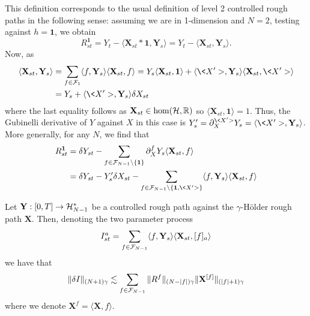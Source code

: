 \documentclass[11pt]{style/preprint}
\begin{document}
This definition corresponds to the usual definition of level 2 controlled rough paths in the following sense: 
assuming we are in 1-dimension and \(N = 2\), testing against \(h = \mathbf{1}\), we obtain
\[R^{\mathbf{1}}_{st} = Y_t - \langle \mathbf{X}_{st} * \mathbf{1}, \mathbf{Y}_s\rangle 
  = Y_t - \langle \mathbf{X}_{st}, \mathbf{Y}_s\rangle.\]
Now, as 
\begin{align*}
  \langle \mathbf{X}_{st}, \mathbf{Y}_s\rangle 
  & = \sum_{f \in \CF_{1}} \langle f, \mathbf{Y}_s\rangle \langle \mathbf{X}_{st}, f\rangle
    = Y_s \langle \mathbf{X}_{st}, \mathbf{1}\rangle 
      + \langle \<X'>, \mathbf{Y}_s\rangle \langle \mathbf{X}_{st}, \<X'>\rangle\\
  & = Y_s + \langle \<X'>, \mathbf{Y}_s\rangle \delta X_{st}
\end{align*}
where the last equality follows as \(\mathbf{X}_{st} \in \hom({\mathcal H}, \mathbb{R})\) so 
\(\langle \mathbf{X}_{st}, \mathbf{1}\rangle = 1\). Thus, the Gubinelli derivative of \(Y\) against 
\(X\) in this case is \(Y'_s = \partial^{\<X'>}_X Y_s = \langle \<X'>, \mathbf{Y}_s\rangle\). 
More generally, for any \(N\), we find that
\begin{align*}
  R^{\mathbf{1}}_{st} 
  & = \delta Y_{st} - 
  \sum_{f \in \CF_{N - 1} \setminus \{\mathbf{1}\}} \partial_X^f Y_s \langle \mathbf{X}_{st}, f\rangle\\
  & = \delta Y_{st} - Y'_s \delta X_{st} - 
    \sum_{f \in \CF_{N - 1} \setminus \{\mathbf{1}, \<X'>\}} \langle f, \mathbf{Y}_s\rangle \langle \mathbf{X}_{st}, f\rangle
\end{align*}
\begin{proposition}
  Let \(\mathbf{Y} : [0, T] \to {\mathcal H}^*_{N - 1}\) be a controlled rough path against the \(\gamma\)-H\"older 
  rough path \(\mathbf{X}\). Then, denoting the two parameter process
  \[I_{st}^a = \sum_{f \in {\mathcal F}_{N - 1}} \langle f, \mathbf{Y}_s\rangle \langle \mathbf{X}_{st}, [f]_a\rangle\] 
  we have that 
  \[\|\delta I\|_{(N + 1)\gamma} \lesssim \sum_{f \in {\mathcal F}_{N - 1}} \|R^f\|_{(N - |f|)\gamma} \|\mathbf{X}^{[f]}\|_{(|f| + 1)\gamma}\]
  where we denote \(\mathbf{X}^f = \langle \mathbf{X}, f\rangle\).
\end{proposition}
\end{document}
